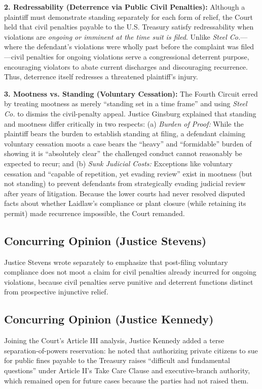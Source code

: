 \documentclass[12pt]{article}
\begin{document}
\textbf{2. Redressability (Deterrence via Public Civil Penalties):} Although a plaintiff must demonstrate standing separately for each form of relief, the Court held that civil penalties payable to the U.S. Treasury satisfy redressability when violations are \textit{ongoing or imminent at the time suit is filed}. Unlike \textit{Steel Co.}---where the defendant's violations were wholly past before the complaint was filed---civil penalties for ongoing violations serve a congressional deterrent purpose, encouraging violators to abate current discharges and discouraging recurrence. Thus, deterrence itself redresses a threatened plaintiff's injury.

\textbf{3. Mootness vs. Standing (Voluntary Cessation):} The Fourth Circuit erred by treating mootness as merely ``standing set in a time frame'' and using \textit{Steel Co.} to dismiss the civil-penalty appeal. Justice Ginsburg explained that standing and mootness differ critically in two respects: (a) \textit{Burden of Proof:} While the plaintiff bears the burden to establish standing at filing, a defendant claiming voluntary cessation moots a case bears the ``heavy'' and ``formidable'' burden of showing it is ``absolutely clear'' the challenged conduct cannot reasonably be expected to recur; and (b) \textit{Sunk Judicial Costs:} Exceptions like voluntary cessation and ``capable of repetition, yet evading review'' exist in mootness (but not standing) to prevent defendants from strategically evading judicial review after years of litigation. Because the lower courts had never resolved disputed facts about whether Laidlaw's compliance or plant closure (while retaining its permit) made recurrence impossible, the Court remanded.

\subsection{Concurring Opinion (Justice Stevens)}

Justice Stevens wrote separately to emphasize that post-filing voluntary compliance does not moot a claim for civil penalties already incurred for ongoing violations, because civil penalties serve punitive and deterrent functions distinct from prospective injunctive relief.

\subsection{Concurring Opinion (Justice Kennedy)}

Joining the Court's Article III analysis, Justice Kennedy added a terse separation-of-powers reservation: he noted that authorizing private citizens to sue for public fines payable to the Treasury raises ``difficult and fundamental questions'' under Article II's Take Care Clause and executive-branch authority, which remained open for future cases because the parties had not raised them.
\end{document}
